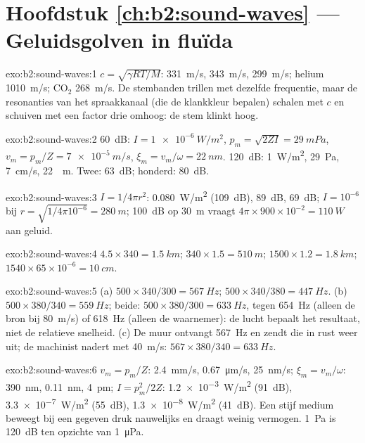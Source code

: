 \section*{Hoofdstuk \ref{ch:b2:sound-waves} --- Geluidsgolven in fluïda}

\begin{solution}{exo:b2:sound-waves:1}
$c = \sqrt{\gamma RT/M}$: \qty{331}{m/s}, \qty{343}{m/s}, \qty{299}{m/s};
helium \qty{1010}{m/s}; CO$_2$ \qty{268}{m/s}. De stembanden trillen met
dezelfde frequentie, maar de resonanties van het spraakkanaal (die de
klankkleur bepalen) schalen met $c$ en schuiven met een factor drie omhoog:
de stem klinkt hoog.
\end{solution}

\begin{solution}{exo:b2:sound-waves:2}
\qty{60}{dB}: $I = \qty{1e-6}{W/m^2}$, $p_m = \sqrt{2ZI} = \qty{29}{mPa}$,
$v_m = p_m/Z =
\qty{7e-5}{m/s}$, $\xi_m = v_m/\omega = \qty{22}{nm}$.
\qty{120}{dB}: \qty{1}{W/m^2}, \qty{29}{Pa}, \qty{7}{cm/s}, \qty{22}{\micro
m}. Twee: \qty{63}{dB}; honderd: \qty{80}{dB}.
\end{solution}

\begin{solution}{exo:b2:sound-waves:3}
$I = 1/4\pi r^2$: \qty{0.080}{W/m^2} (\qty{109}{dB}), \qty{89}{dB},
\qty{69}{dB}; $I = 10^{-6}$ bij $r = \sqrt{1/4\pi10^{-6}} = \qty{280}{m}$;
\qty{100}{dB} op \qty{30}{m} vraagt
$4\pi \times
900 \times 10^{-2} = \qty{110}{W}$ aan geluid.
\end{solution}

\begin{solution}{exo:b2:sound-waves:4}
$4.5 \times 340 = \qty{1.5}{km}$; $340 \times 1.5 = \qty{510}{m}$;
$1500 \times 1.2 = \qty{1.8}{km}$;
$1540 \times 65 \times 10^{-6} = \qty{10}{cm}$.
\end{solution}

\begin{solution}{exo:b2:sound-waves:5}
(a) $500 \times 340/300 = \qty{567}{Hz}$;
$500 \times 340/380 = \qty{447}{Hz}$. (b)
$500 \times
380/340 = \qty{559}{Hz}$; beide:
$500 \times 380/300 = \qty{633}{Hz}$, tegen \qty{654}{Hz} (alleen de bron
bij \qty{80}{m/s}) of \qty{618}{Hz} (alleen de waarnemer): de lucht bepaalt
het resultaat, niet de relatieve snelheid. (c) De muur ontvangt
\qty{567}{Hz} en zendt die in rust weer uit; de machinist nadert met
\qty{40}{m/s}: $567 \times
380/340 = \qty{633}{Hz}$.
\end{solution}

\begin{solution}{exo:b2:sound-waves:6}
$v_m = p_m/Z$: \qty{2.4}{mm/s}, \qty{0.67}{\micro m/s}, \qty{25}{nm/s};
$\xi_m = v_m/\omega$: \qty{390}{nm}, \qty{0.11}{nm}, \qty{4}{pm};
$I = p_m^2/2Z$: \qty{1.2e-3}{W/m^2} (\qty{91}{dB}), \qty{3.3e-7}{W/m^2}
(\qty{55}{dB}), \qty{1.3e-8}{W/m^2} (\qty{41}{dB}). Een stijf medium beweegt
bij een gegeven druk nauwelijks en draagt weinig vermogen. \qty{1}{Pa} is
\qty{120}{dB} ten opzichte van \qty{1}{\micro Pa}.
\end{solution}

